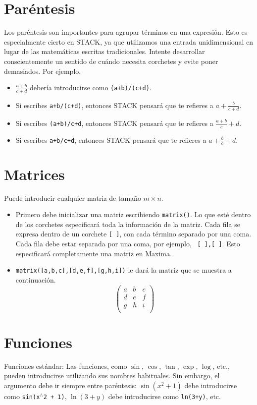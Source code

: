 \documentclass[a4paper]{article}
\newcommand{\stack}[1]{{\color{red}\tt #1}}
\begin{document}
\begin{multicols}{2}
\section*{Paréntesis}
Los paréntesis son importantes para agrupar términos en una expresión. Esto es especialmente cierto en STACK, ya que utilizamos una entrada unidimensional en lugar de las matemáticas escritas tradicionales. Intente desarrollar conscientemente un sentido de cuándo necesita corchetes y evite poner demasiados. Por ejemplo,
\begin{itemize}
\item $\frac{a+b}{c+d}$ debería introducirse como \stack{(a+b)/(c+d)}.
\item Si escribes \stack{a+b/(c+d)}, entonces STACK pensará que te refieres a $a + \frac{b}{c+d}$.
\item Si escribes \stack{(a+b)/c+d}, entonces STACK pensará que te refieres a $\frac{a+b}{c} + d$.
\item Si escribes \stack{a+b/c+d}, entonces STACK pensará que te refieres a $a + \frac{b}{c} + d$.
\end{itemize}

\section*{Matrices}
Puede introducir cualquier matriz de tamaño $m\times n$.
\begin{itemize}
\item Primero debe inicializar una matriz escribiendo \stack{matrix()}. Lo que esté dentro de los corchetes especificará toda la información de la matriz. Cada fila se expresa dentro de un corchete \stack{[ ]}, con cada término separado por una coma. Cada fila debe estar separada por una coma, por ejemplo, ~\stack{[ ],[ ]}. Esto especificará completamente una matriz en Maxima.
\item \stack{matrix([a,b,c],[d,e,f],[g,h,i])} le dará la matriz que se muestra a continuación.
\begin{displaymath}
\left( \begin{array}{ccc} a & b & c \\ d & e & f \\ g & h & i \\ \end{array} \right)
\end{displaymath}
\end{itemize}
\section*{Funciones}
Funciones estándar: Las funciones, como $\sin$, $\cos$, $\tan$, $\exp$, $\log$, etc., pueden introducirse utilizando sus nombres habituales. Sin embargo, el argumento debe ir siempre entre paréntesis: $\sin{(x^2 + 1)}$ debe introducirse como \stack{sin(x$^{\wedge}$2 + 1)}, $\ln{(3+y)}$ debe introducirse como \stack{ln(3+y)}, etc.


\end{multicols}
\end{document}
